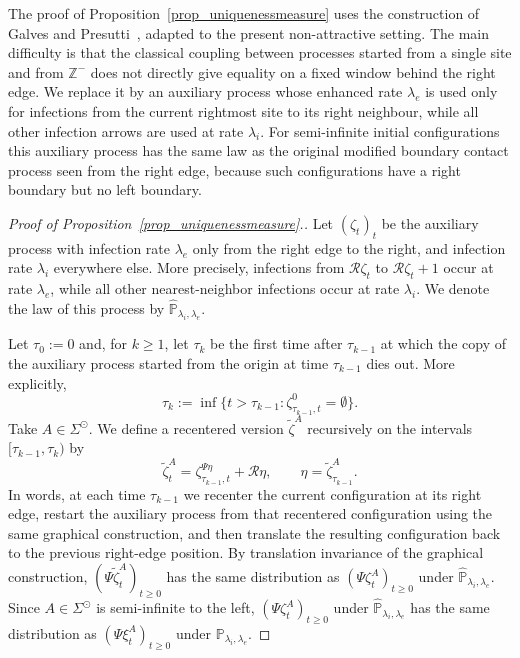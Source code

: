 \documentclass[11pt,a4paper]{article}
\theoremstyle{plain}
\theoremstyle{definition}
\theoremstyle{remark}
\numberwithin{equation}{section}
\begin{document}
	The proof of Proposition~\ref{prop_uniquenessmeasure} uses the construction of Galves and Presutti~\cite{GalvesPresutti87}, adapted to the present non-attractive setting. The main difficulty is that the classical coupling between processes started from a single site and from $\mathbb{Z}^-$ does not directly give equality on a fixed window behind the right edge. We replace it by an auxiliary process whose enhanced rate $\lambda_e$ is used only for infections from the current rightmost site to its right neighbour, while all other infection arrows are used at rate $\lambda_i$. For semi-infinite initial configurations this auxiliary process has the same law as the original modified boundary contact process seen from the right edge, because such configurations have a right boundary but no left boundary.
	
	\begin{proof}[{Proof of Proposition~\ref{prop_uniquenessmeasure}.}]
	Let $(\zeta_t)_t$ be the auxiliary process with infection rate $\lambda_e$ only from the right edge to the right, and infection rate $\lambda_i$ everywhere else. More precisely, infections from $\mathcal{R}\zeta_t$ to $\mathcal{R}\zeta_t+1$ occur at rate $\lambda_e$, while all other nearest-neighbor infections occur at rate $\lambda_i$. We denote the law of this process by $\widehat{\mathbb{P}}_{\lambda_i,\lambda_e}$.
			
	Let $\tau_0:=0$ and, for $k\ge1$, let $\tau_k$ be the first time after $\tau_{k-1}$ at which the copy of the auxiliary process started from the origin at time $\tau_{k-1}$ dies out. More explicitly,
		\[\tau_k:=\inf\{t>\tau_{k-1}:\zeta_{\tau_{k-1},t}^{0}=\emptyset\}.\]
	Take $A\in\Sigma^{\odot}$. We define a recentered version $\tilde{\zeta}^A$ recursively on the intervals $[\tau_{k-1},\tau_k)$ by
		\[\tilde{\zeta}^A_t=\zeta_{\tau_{k-1},t}^{\Psi \eta}+\mathcal{R}\eta,\qquad \eta=\tilde{\zeta}^A_{\tau_{k-1}}.\]
	In words, at each time $\tau_{k-1}$ we recenter the current configuration at its right edge, restart the auxiliary process from that recentered configuration using the same graphical construction, and then translate the resulting configuration back to the previous right-edge position. By translation invariance of the graphical construction, $(\Psi\tilde{\zeta}^A_t)_{t\ge0}$ has the same distribution as $(\Psi\zeta^A_t)_{t\ge0}$ under $\widehat{\mathbb{P}}_{\lambda_i,\lambda_e}$. Since $A\in\Sigma^{\odot}$ is semi-infinite to the left, $(\Psi\zeta^A_t)_{t\ge0}$ under $\widehat{\mathbb{P}}_{\lambda_i,\lambda_e}$ has the same distribution as $(\Psi\xi^A_t)_{t\ge0}$ under $\mathbb{P}_{\lambda_i,\lambda_e}$.
	

\end{proof}
\end{document}
